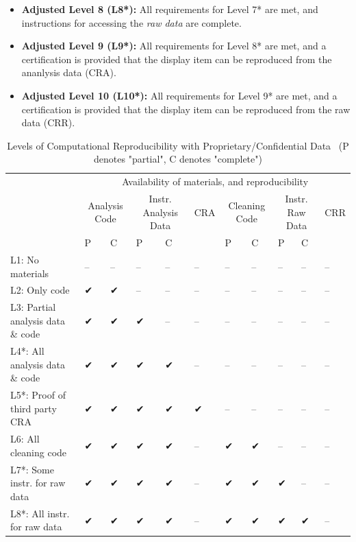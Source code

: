 \documentclass[
]{book}
\begin{document}
\begin{itemize}
\item
  \textbf{Adjusted Level 8 (L8*):} All requirements for Level 7* are met, and instructions for accessing the \emph{raw data} are complete.
\item
  \textbf{Adjusted Level 9 (L9*):} All requirements for Level 8* are met, and a certification is provided that the display item can be reproduced from the ananlysis data (CRA).
\item
  \textbf{Adjusted Level 10 (L10*):} All requirements for Level 9* are met, and a certification is provided that the display item can be reproduced from the raw data (CRR).
\end{itemize}

\begin{table}

\caption{\label{tab:levels-of-computational-reproducibility-adjusted}Levels of Computational Reproducibility with Proprietary/Confidential Data \
 (P denotes "partial", C denotes "complete")}
\centering
\begin{tabular}[t]{l|l|l|l|l|l|l|l|l|l|l}
\hline
\multicolumn{1}{c|}{ } & \multicolumn{10}{c}{Availability of materials, and reproducibility} \\
\cline{2-11}
\multicolumn{1}{c|}{ } & \multicolumn{2}{c|}{Analysis Code} & \multicolumn{2}{c|}{Instr. Analysis Data} & \multicolumn{1}{c|}{CRA} & \multicolumn{2}{c|}{Cleaning Code} & \multicolumn{2}{c|}{Instr. Raw Data} & \multicolumn{1}{c}{CRR} \\
\cline{2-3} \cline{4-5} \cline{6-6} \cline{7-8} \cline{9-10} \cline{11-11}
  & P & C & P & C &   & P & C & P & C &  \\
\hline
L1: No materials & -- & -- & -- & -- & -- & -- & -- & -- & -- & --\\
\hline
L2: Only code & ✔ & ✔ & -- & -- & -- & -- & -- & -- & -- & --\\
\hline
L3: Partial analysis data \& code & ✔ & ✔ & ✔ & -- & -- & -- & -- & -- & -- & --\\
\hline
L4*: All analysis data \& code & ✔ & ✔ & ✔ & ✔ & -- & -- & -- & -- & -- & --\\
\hline
L5*: Proof of third party CRA & ✔ & ✔ & ✔ & ✔ & ✔ & -- & -- & -- & -- & --\\
\hline
L6: All cleaning code & ✔ & ✔ & ✔ & ✔ & -- & ✔ & ✔ & -- & -- & --\\
\hline
L7*: Some instr. for raw data & ✔ & ✔ & ✔ & ✔ & -- & ✔ & ✔ & ✔ & -- & --\\
\hline
L8*: All instr. for raw data & ✔ & ✔ & ✔ & ✔ & -- & ✔ & ✔ & ✔ & ✔ & --\\

\end{tabular}
\end{table}
\end{document}
